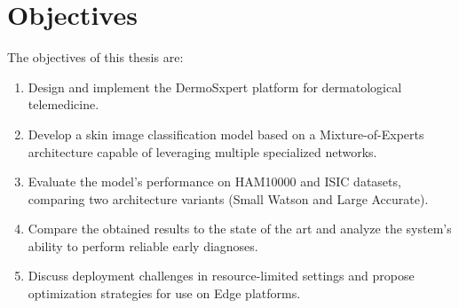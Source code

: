 \medskip

\section*{Objectives}

The objectives of this thesis are:
\begin{enumerate}
    \item Design and implement the DermoSxpert platform for dermatological telemedicine.
    \item Develop a skin image classification model based on a Mixture-of-Experts architecture capable of leveraging multiple specialized networks.
    \item Evaluate the model's performance on HAM10000 and ISIC datasets, comparing two architecture variants (Small Watson and Large Accurate).
    \item Compare the obtained results to the state of the art and analyze the system's ability to perform reliable early diagnoses.
    \item Discuss deployment challenges in resource-limited settings and propose optimization strategies for use on Edge platforms.
\end{enumerate}
